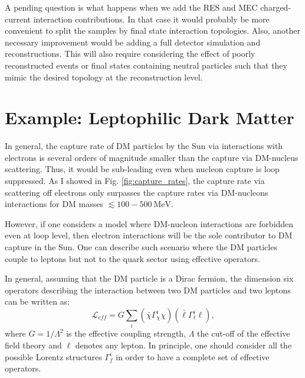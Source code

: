 A pending question is what happens when we add the RES and MEC charged-current interaction contributions. In that case it would probably be more convenient to split the samples by final state interaction topologies. Also, another necessary improvement would be adding a full detector simulation and reconstructions. This will also require considering the effect of poorly reconstructed events or final states containing neutral particles such that they mimic the desired topology at the reconstruction level.

\section{Example: Leptophilic Dark Matter}
\label{sec:dm_analysis_leptophilic_dm}

In general, the capture rate of DM particles by the Sun via interactions with electrons is several orders of magnitude smaller than the capture via DM-nucleus scattering. Thus, it would be sub-leading even when nucleon capture is loop suppressed. As I showed in Fig. \ref{fig:capture_rates}, the capture rate via scattering off electrons only surpasses the capture rates via DM-nucleons interactions for DM masses $\lesssim 100 - 500 \ \mathrm{MeV}$.

However, if one considers a model where DM-nucleon interactions are forbidden even at loop level, then electron interactions will be the sole contributor to DM capture in the Sun. One can describe such scenario where the DM particles couple to leptons but not to the quark sector using effective operators.

In general, assuming that the DM particle is a Dirac fermion, the dimension six operators describing the interaction between two DM particles and two leptons can be written as:
\begin{equation}\label{7.1}
	\mathcal{L}_{eff} = G \sum_{i} \left(\bar{\chi} \Gamma^{i}_{\chi} \chi\right)\left(\bar{\ell} \Gamma^{i}_{\ell} \ell\right),
\end{equation}
where $G=1/\Lambda^{2}$ is the effective coupling strength, $\Lambda$ the cut-off of the effective field theory and $\ell$ denotes any lepton. In principle, one should consider all the possible Lorentz structures $\Gamma^{i}_{f}$ in order to have a complete set of effective operators.

